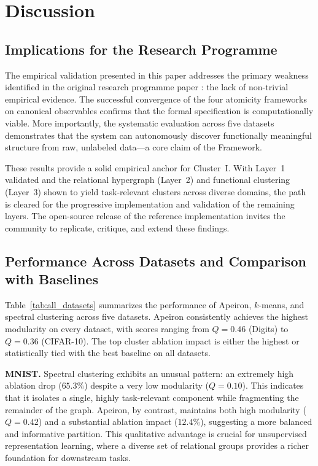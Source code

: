 \clearpage
\section{Discussion}
\label{sec:discussion}

\subsection{Implications for the \Apeiron{} Research Programme}

The empirical validation presented in this paper addresses the primary weakness identified in the original \Apeiron{} research programme paper \cite{beniers2026apeiron}: the lack of non-trivial empirical evidence. The successful convergence of the four atomicity frameworks on canonical observables confirms that the formal specification is computationally viable. More importantly, the systematic evaluation across five datasets demonstrates that the system can autonomously discover functionally meaningful structure from raw, unlabeled data---a core claim of the \Apeiron{} Framework.

These results provide a solid empirical anchor for Cluster~I. With Layer~1 validated and the relational hypergraph (Layer~2) and functional clustering (Layer~3) shown to yield task-relevant clusters across diverse domains, the path is cleared for the progressive implementation and validation of the remaining layers. The open-source release of the reference implementation invites the community to replicate, critique, and extend these findings.

\subsection{Performance Across Datasets and Comparison with Baselines}

Table~\ref{tab:all_datasets} summarizes the performance of Apeiron, $k$-means, and spectral clustering across five datasets. Apeiron consistently achieves the highest modularity on every dataset, with scores ranging from $Q = 0.46$ (Digits) to $Q = 0.36$ (CIFAR-10). The top cluster ablation impact is either the highest or statistically tied with the best baseline on all datasets.

\textbf{MNIST.} Spectral clustering exhibits an unusual pattern: an extremely high ablation drop ($65.3\%$) despite a very low modularity ($Q = 0.10$). This indicates that it isolates a single, highly task-relevant component while fragmenting the remainder of the graph. Apeiron, by contrast, maintains both high modularity ($Q = 0.42$) and a substantial ablation impact ($12.4\%$), suggesting a more balanced and informative partition. This qualitative advantage is crucial for unsupervised representation learning, where a diverse set of relational groups provides a richer foundation for downstream tasks.

